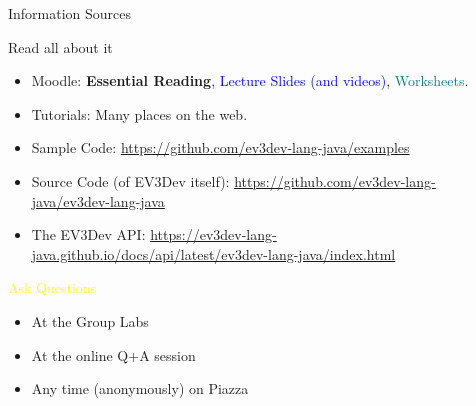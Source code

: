 \documentclass[color=pdftex,usenames,dvipsnames, aspectratio=169]{beamer}
\begin{document}
\begin{frame}{Information Sources}
\begin{block}{Read all about it}
\begin{itemize}
\item \textcolor{OliveGreen}{Moodle:} \textcolor{RedOrange}{\textbf{Essential Reading}}, \textcolor{blue}{Lecture Slides (and videos)}, \textcolor{teal}{Worksheets}.
\item \textcolor{OliveGreen}{Tutorials:} Many places on the web.  
\item \textcolor{OliveGreen}{Sample Code:} \url{https://github.com/ev3dev-lang-java/examples}
\item \textcolor{OliveGreen}{Source Code (of EV3Dev itself):} \url{https://github.com/ev3dev-lang-java/ev3dev-lang-java}
\item \textcolor{OliveGreen}{The EV3Dev API:} \url{https://ev3dev-lang-java.github.io/docs/api/latest/ev3dev-lang-java/index.html}
\end{itemize}
\end{block}

\begin{block}{\textcolor{yellow}{Ask Questions}}
\begin{itemize}
    \item At the Group Labs
    \item At the online Q+A session
    \item Any time (anonymously) on Piazza
\end{itemize}
\end{block}
\end{frame}
\end{document}
